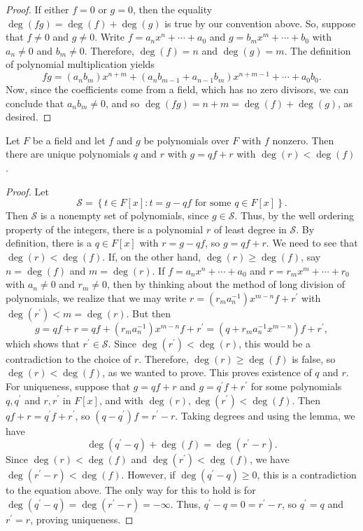 \begin{proof}
If either $f=0$ or $g=0$, then the equality $\deg(fg)=\deg(f)+\deg(g)$ is true
by our convention above. So, suppose that $f\neq0$ and $g\neq0$. Write
$f=a_{n}x^{n}+\cdots+a_{0}$ and $g=b_{m}x^{m}+\cdots+b_{0}$ with $a_{n}\neq0$
and $b_{m}\neq0$. Therefore, $\deg(f)=n$ and $\deg(g)=m$. The definition of
polynomial multiplication yields
\[
fg=(a_{n}b_{m})x^{n+m}+(a_{n}b_{m-1}+a_{n-1}b_{m})x^{n+m-1}+\cdots+a_{0}%
b_{0}.
\]
Now, since the coefficients come from a field, which has no zero divisors, we
can conclude that $a_{n}b_{m}\neq0$, and so $\deg(fg)=n+m=\deg(f)+\deg(g)$, as desired.
\end{proof}


\begin{proposition}
%
%
Let $F$ be a field and let $f$ and $g$ be polynomials over $F$ with $f$
nonzero. Then there are unique polynomials $q$ and $r$ with $g=qf+r$ with
$\deg(r)<\deg(f)$.
\end{proposition}

\begin{proof}
Let
\[
\mathcal{S}=\left\{  t\in F[x]:t=g-qf\text{ for some }q\in F[x]\right\}  .
\]
Then $\mathcal{S}$ is a nonempty set of polynomials, since $g\in\mathcal{S}$.
Thus, by the well ordering property of the integers, there is a polynomial $r$
of least degree in $\mathcal{S}$. By definition, there is a $q\in F[x]$ with
$r=g-qf$, so $g=qf+r$. We need to see that $\deg(r)<\deg(f)$. If, on the other
hand, $\deg(r)\geq\deg(f)$, say $n=\deg(f)$ and $m=\deg(r)$. If $f=a_{n}%
x^{n}+\cdots+a_{0}$ and $r=r_{m}x^{m}+\cdots+r_{0}$ with $a_{n}\neq0$ and
$r_{m}\neq0$, then by thinking about the method of long division of
polynomials, we realize that we may write $r=(r_{m}a_{n}^{-1})x^{m-n}%
f+r^{\prime}$ with $\deg(r^{\prime})<m=\deg(r)$. But then%
\[
g=qf+r=qf+(r_{m}a_{n}^{-1})x^{m-n}f+r^{\prime}=(q+r_{m}a_{n}^{-1}%
x^{m-n})f+r^{\prime},
\]
which shows that $r^{\prime}\in\mathcal{S}$. Since $\deg(r^{\prime})<\deg(r)$,
this would be a contradiction to the choice of $r$. Therefore, $\deg
(r)\geq\deg(f)$ is false, so $\deg(r)<\deg(f)$, as we wanted to prove. This
proves existence of $q$ and $r$. For uniqueness, suppose that $g=qf+r$ and
$g=q^{\prime}f+r^{\prime}$ for some polynomials $q,q^{\prime}$ and
$r,r^{\prime}$ in $F[x]$, and with $\deg(r),\deg(r^{\prime})<\deg(f) $. Then
$qf+r=q^{\prime}f+r^{\prime}$, so $(q-q^{\prime})f=r^{\prime}-r$. Taking
degrees and using the lemma, we have
\[
\deg(q^{\prime}-q)+\deg(f)=\deg(r^{\prime}-r).
\]
Since $\deg(r)<\deg(f)$ and $\deg(r^{\prime})<\deg(f)$, we have $\deg
(r^{\prime}-r)<\deg(f)$. However, if $\deg(q^{\prime}-q)\geq0$, this is a
contradiction to the equation above. The only way for this to hold is for
$\deg(q^{\prime}-q)=\deg(r^{\prime}-r)=-\infty$. Thus, $q^{\prime
}-q=0=r^{\prime}-r$, so $q^{\prime}=q$ and $r^{\prime}=r$, proving uniqueness.
\end{proof}


